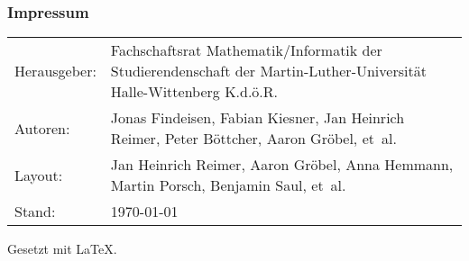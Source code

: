 \subsubsection{Impressum}
\begin{tabu} to 
    Herausgeber: & Fachschaftsrat Mathematik/Informatik der
        Studierendenschaft der Martin-Luther-Universität Halle-Wittenberg K.d.ö.R. \\
    Autoren: &
        Jonas Findeisen,
        Fabian Kiesner,
        Jan Heinrich Reimer,
        Peter Böttcher,
        Aaron Gröbel,
        et~al. \\
    Layout: & 
        Jan Heinrich Reimer,
        Aaron Gröbel,
        Anna Hemmann,
        Martin Porsch,
        Benjamin Saul, 
        et~al. \\
    Stand: & \today
\end{tabu}
{\scriptsize Gesetzt mit \LaTeX.}
\newpage

